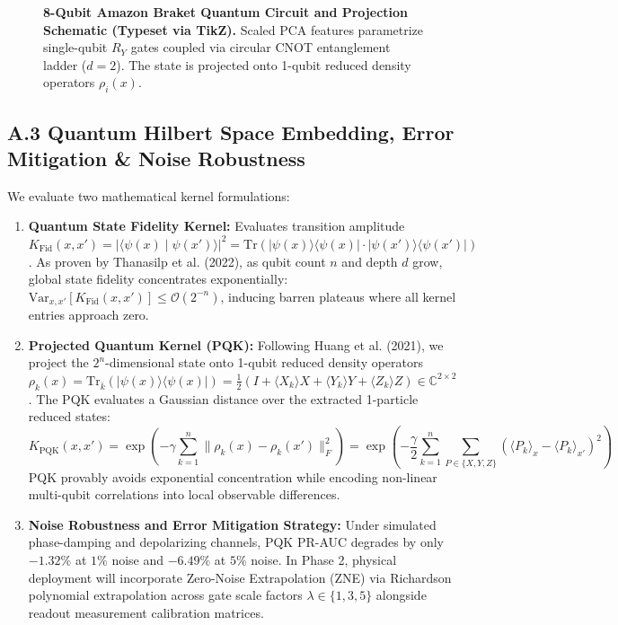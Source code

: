 \documentclass[10pt,a4paper]{article}
\begin{document}
\begin{figure}[h!]
\begin{tikzpicture}
\end{tikzpicture}
\vspace{-4pt}
\caption{\textbf{8-Qubit Amazon Braket Quantum Circuit and Projection Schematic (Typeset via TikZ).} Scaled PCA features parametrize single-qubit $R_Y$ gates coupled via circular CNOT entanglement ladder ($d=2$). The state is projected onto 1-qubit reduced density operators $\rho_i(x)$.}
\label{fig:circuit}
\end{figure}
\vspace{-6pt}

\subsection*{A.3 Quantum Hilbert Space Embedding, Error Mitigation \& Noise Robustness}
We evaluate two mathematical kernel formulations:
\begin{enumerate}[leftmargin=*,itemsep=0.4pt,topsep=1pt]
\item \textbf{Quantum State Fidelity Kernel:} Evaluates transition amplitude $K_{\text{Fid}}(x, x') = |\langle \psi(x) \mid \psi(x') \rangle|^2 = \mathrm{Tr}(|\psi(x)\rangle\langle\psi(x)| \cdot |\psi(x')\rangle\langle\psi(x')|)$. As proven by Thanasilp et al. (2022), as qubit count $n$ and depth $d$ grow, global state fidelity concentrates exponentially: $\mathrm{Var}_{x, x'}[K_{\text{Fid}}(x, x')] \le \mathcal{O}(2^{-n})$, inducing barren plateaus where all kernel entries approach zero.
\item \textbf{Projected Quantum Kernel (PQK):} Following Huang et al. (2021), we project the $2^n$-dimensional state onto 1-qubit reduced density operators $\rho_k(x) = \mathrm{Tr}_{\bar{k}}(|\psi(x)\rangle\langle\psi(x)|) = \frac{1}{2} (I + \langle X_k \rangle X + \langle Y_k \rangle Y + \langle Z_k \rangle Z) \in \mathbb{C}^{2 \times 2}$. The PQK evaluates a Gaussian distance over the extracted 1-particle reduced states:
\begin{equation}
K_{\text{PQK}}(x, x') = \exp\left( -\gamma \sum_{k=1}^n \|\rho_k(x) - \rho_k(x')\|_F^2 \right) = \exp\left( -\frac{\gamma}{2} \sum_{k=1}^n \sum_{P \in \{X, Y, Z\}} (\langle P_k \rangle_x - \langle P_k \rangle_{x'})^2 \right)
\end{equation}
PQK provably avoids exponential concentration while encoding non-linear multi-qubit correlations into local observable differences.
\item \textbf{Noise Robustness and Error Mitigation Strategy:} Under simulated phase-damping and depolarizing channels, PQK PR-AUC degrades by only $-1.32\%$ at $1\%$ noise and $-6.49\%$ at $5\%$ noise. In Phase 2, physical deployment will incorporate Zero-Noise Extrapolation (ZNE) via Richardson polynomial extrapolation across gate scale factors $\lambda \in \{1, 3, 5\}$ alongside readout measurement calibration matrices.
\end{enumerate}
\end{document}
